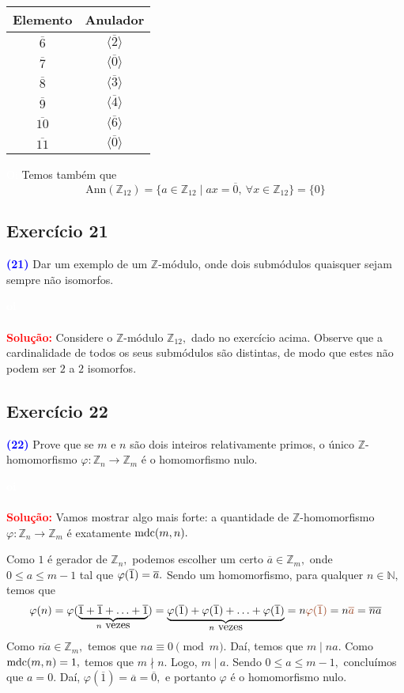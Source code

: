 \documentclass[11pt,a4paper]{article}
\newcommand{\exercicio}[1]{\subsection{Exercício #1} \textcolor{blue}{\bf(#1)}}
\newcommand{\solucao}[1]{
\textbf{\textcolor{white}{oi}\\ \\ \textcolor{red}{Solução:}} #1}
\begin{document}
{\begin{minipage}{.5\textwidth}
\end{minipage} 
\begin{minipage}{.5\textwidth}
\centering
\begin{tabular}{|c|c|}
\toprule
Elemento & Anulador \\ \hline
$\overline{6}$ & $\langle \overline{2} \rangle$ \\\hline
$\overline{7}$ & $\langle \overline{0} \rangle$ \\\hline
$\overline{8}$ & $\langle \overline{3} \rangle$ \\\hline
$\overline{9}$ & $\langle \overline{4} \rangle$ \\\hline
$\overline{10}$ & $\langle \overline{6} \rangle$ \\\hline
$\overline{11}$ & $\langle \overline{0} \rangle$ \\ \hline
\end{tabular}
  
\end{minipage} 


\noindent\newline\textcolor{white}{Oi}\newline
Temos também que
\[
\mbox{Ann}(\mathbb{Z}_{12}) = \{ a \in \mathbb{Z}_{12} \mid ax = \overline{0}, \ \forall x \in \mathbb{Z}_{12} \} = \{ 0 \}
\]
}
\exercicio{21} Dar um exemplo de um $\mathbb{Z}$-módulo, onde dois submódulos quaisquer sejam sempre não isomorfos.
\solucao{Considere o $\mathbb{Z}$-módulo $\mathbb{Z}_{12},$ dado no exercício acima. Observe que a cardinalidade de todos os seus submódulos são distintas, de modo que estes não podem ser $2$ a $2$ isomorfos.}
\exercicio{22} Prove que se $m$ e $n$ são dois inteiros relativamente primos, o único $\mathbb{Z}$-homomorfismo $\varphi \colon \mathbb{Z}_n \to \mathbb{Z}_m$ é
o homomorfismo nulo.
\solucao{
Vamos mostrar algo mais forte: a quantidade de $\mathbb{Z}$-homomorfismo $\varphi \colon \mathbb{Z}_n \to \mathbb{Z}_m$ é exatamente ${\rm mdc}(m,n).$ 

Como $1$ é gerador de $\mathbb{Z}_n,$ podemos escolher um certo $\overline{a} \in \mathbb{Z}_m,$ onde $0 \le a \le m-1$ tal que $\varphi(\overline{1}) = \overline{a}.$ Sendo um homomorfismo, para qualquer $n \in \mathbb{N},$ temos que
\[
\varphi(n) = \varphi(\underbrace{\ovelrine{1} + \ovelrine{1} + \ldots + \ovelrine{1}}_{n \mbox{ vezes}}) = \underbrace{\varphi(\ovelrine{1}) + \varphi(\ovelrine{1}) + \ldots + \varphi(\ovelrine{1})}_{n \mbox{ vezes}} =n \textcolor{RawSienna}{\varphi(\overline{1})} =n \textcolor{RawSienna}{\overline{a}} = \overline{na}
\]
Como $\overline{na} \in \mathbb{Z}_m,$ temos que $na \equiv 0 \pmod m.$ Daí, temos que $m \mid na.$ Como ${\rm mdc}(m,n) = 1,$ temos que $m \nmid n.$ Logo, $m \mid a.$ Sendo $0 \le a \le m-1,$ concluímos que $a = 0.$ Daí, $\varphi(\overline{1}) = \overline{a} = \overline{0},$ e portanto $\varphi$ é o homomorfismo nulo.





}
\end{document}
